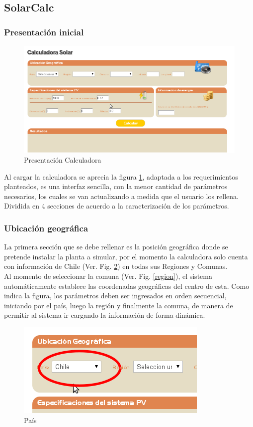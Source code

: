 \newpage 
\subsection{SolarCalc}
\subsubsection{Presentación inicial}
\begin{figure}[ht]
        \centering
        \includegraphics[scale=0.4]{./images/cap5chap1img6}
        \caption{Presentación Calculadora}
        \label{figCalculadora}
\end{figure}

Al cargar la calculadora se aprecia la figura \ref{figCalculadora}, adaptada a los requerimientos planteados, es una interfaz sencilla, con la menor cantidad de parámetros necesarios, los cuales se van actualizando a medida que el usuario los rellena. Dividida en 4 secciones de acuerdo a la caracterización de los parámetros.

\subsubsection{Ubicación geográfica}
La primera sección que se debe rellenar es la posición geográfica donde se pretende instalar la planta a simular, por el momento la calculadora solo cuenta con información de Chile (Ver. Fig. \ref{pais}) en todas sus Regiones y Comunas.\\ Al momento de seleccionar la comuna (Ver. Fig. \ref{region}), el sistema automáticamente establece las coordenadas geográficas del centro de esta. Como indica la figura, los parámetros deben ser ingresados en orden secuencial, iniciando por el país, luego la región y finalmente la comuna, de manera de permitir al sistema ir cargando la información de forma dinámica.
\begin{figure}[ht]
	\centering
	\includegraphics[scale=0.5]{./images/cap5chap1img7-1}
	\caption{País}
	\label{pais}
\end{figure}

